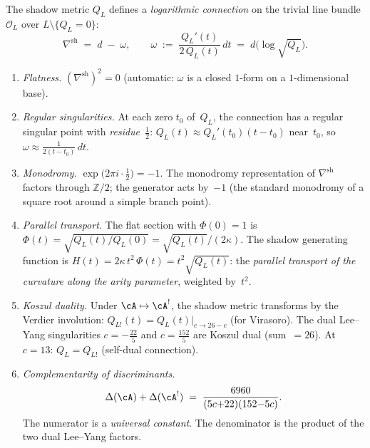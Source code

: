 \begin{theorem}
\label{thm:shadow-connection}
\ClaimStatusProvedHere
{}
The shadow metric $Q_L$ defines a \emph{logarithmic
connection} on the trivial line bundle
$\mathcal{O}_L$ over $L \setminus \{Q_L = 0\}$:
\begin{equation}\label{eq:shadow-connection}
  \nabla^{\mathrm{sh}}
  \;=\; d \;-\; \omega,
  \qquad
  \omega
  \;:=\;
  \frac{Q_L'(t)}{2\,Q_L(t)}\,dt
  \;=\; d\bigl(\log\sqrt{Q_L}\bigr).
\end{equation}
\begin{enumerate}[label=\textup{(\roman*)}]
\item \emph{Flatness.}\enspace
  $(\nabla^{\mathrm{sh}})^2 = 0$ (automatic: $\omega$ is
  a closed $1$-form on a $1$-dimensional base).

\item \emph{Regular singularities.}\enspace
  At each zero $t_0$ of~$Q_L$, the connection has a
  regular singular point with \emph{residue~$\tfrac{1}{2}$}:
  $Q_L(t) \approx Q_L'(t_0)(t{-}t_0)$ near~$t_0$, so
  $\omega \approx \frac{1}{2(t-t_0)}\,dt$.

\item \emph{Monodromy.}\enspace
  $\exp\bigl(2\pi i \cdot \tfrac{1}{2}\bigr) = -1$.
  The monodromy representation of $\nabla^{\mathrm{sh}}$
  factors through $\mathbb{Z}/2$; the generator acts by~$-1$
  (the standard monodromy of a square root around a
  simple branch point).

\item \emph{Parallel transport.}\enspace
  The flat section with $\Phi(0) = 1$ is
  $\Phi(t) = \sqrt{Q_L(t)/Q_L(0)} = \sqrt{Q_L(t)}/(2\kappa)$.
  The shadow generating function is
  $H(t) = 2\kappa\,t^2\,\Phi(t) = t^2\sqrt{Q_L(t)}$:
  the \emph{parallel transport of the curvature along the
  arity parameter}, weighted by~$t^2$.

\item \emph{Koszul duality.}\enspace
  Under $\cA \mapsto \cA^!$, the shadow metric transforms
  by the Verdier involution:
  $Q_{L!}(t) = Q_L(t)\big|_{c \to 26-c}$
  \textup{(}for Virasoro\textup{)}.
  The dual Lee--Yang singularities
  $c = -\tfrac{22}{5}$ and $c = \tfrac{152}{5}$
  are Koszul dual \textup{(}sum~$= 26$\textup{)}.
  At $c = 13$: $Q_L = Q_{L!}$ \textup{(}self-dual
  connection\textup{)}.

\item \emph{Complementarity of discriminants.}\enspace
  \begin{equation}\label{eq:discriminant-complementarity}
    \Delta(\cA) + \Delta(\cA^!)
    \;=\;
    \frac{6960}{(5c{+}22)(152{-}5c)}.
  \end{equation}
  The numerator is a \emph{universal constant}.
  The denominator is the product of the two dual Lee--Yang
  factors.


\end{enumerate}
\end{theorem}
